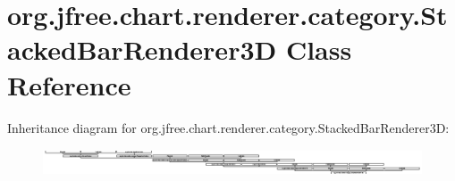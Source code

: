 \hypertarget{classorg_1_1jfree_1_1chart_1_1renderer_1_1category_1_1_stacked_bar_renderer3_d}{}\section{org.\+jfree.\+chart.\+renderer.\+category.\+Stacked\+Bar\+Renderer3D Class Reference}
\label{classorg_1_1jfree_1_1chart_1_1renderer_1_1category_1_1_stacked_bar_renderer3_d}
Inheritance diagram for org.\+jfree.\+chart.\+renderer.\+category.\+Stacked\+Bar\+Renderer3D\+:\begin{figure}[H]
\begin{center}
\leavevmode
\includegraphics[height=0.787254cm]{classorg_1_1jfree_1_1chart_1_1renderer_1_1category_1_1_stacked_bar_renderer3_d}
\end{center}
\end{figure}
